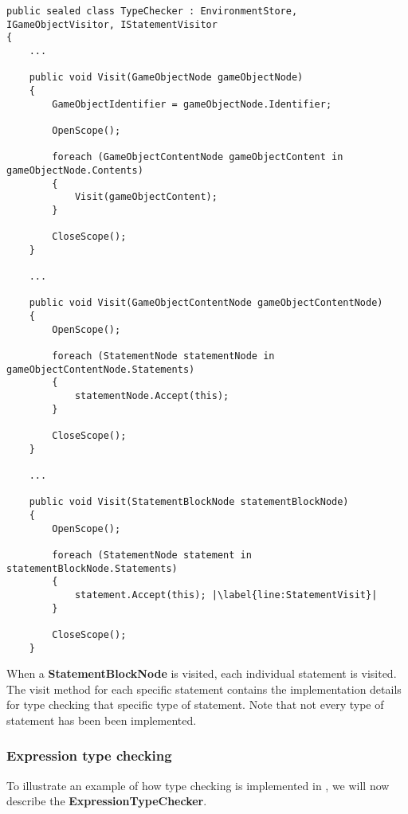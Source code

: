 \begin{lstlisting}[language=CSharp, caption={Applying Scope to GameObjects, GameObjectContents and StatementBlocks}, label={lst:ApplyScope},escapechar=|]
public sealed class TypeChecker : EnvironmentStore, IGameObjectVisitor, IStatementVisitor
{
    ...

    public void Visit(GameObjectNode gameObjectNode)
    {
        GameObjectIdentifier = gameObjectNode.Identifier;

        OpenScope();

        foreach (GameObjectContentNode gameObjectContent in gameObjectNode.Contents) 
        {
            Visit(gameObjectContent);
        }

        CloseScope();
    }

    ...

    public void Visit(GameObjectContentNode gameObjectContentNode)
    {
        OpenScope();

        foreach (StatementNode statementNode in gameObjectContentNode.Statements)
        {
            statementNode.Accept(this);
        }

        CloseScope();
    }

    ... 

    public void Visit(StatementBlockNode statementBlockNode)
    {
        OpenScope();

        foreach (StatementNode statement in statementBlockNode.Statements) 
        {
            statement.Accept(this); |\label{line:StatementVisit}|
        }
        
        CloseScope();
    }
\end{lstlisting}

When a \textbf{StatementBlockNode} is visited, each individual statement is visited. The visit method for each specific statement contains the implementation details for type checking that specific type of statement. Note that not every type of statement has been been implemented.

\subsubsection*{Expression type checking} \label{sec:ExpressionTypeChecking}
To illustrate an example of how type checking is implemented in \dazel{}, we will now describe the \textbf{ExpressionTypeChecker}.
